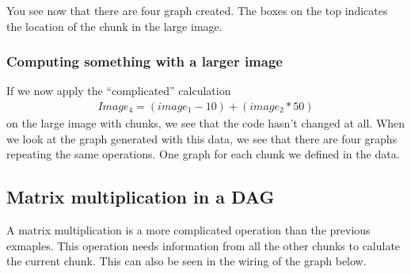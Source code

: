 \documentclass[letterpaper,10pt,english]{sphinxmanual}
\begin{document}
\noindent{}

\sphinxAtStartPar
You see now that there are four graph created. The boxes on the top indicates the location of the chunk in the large image.


\subsubsection{Computing something with a larger image}
\label{\detokenize{01-Introduction:computing-something-with-a-larger-image}}
\sphinxAtStartPar
If we now apply the “complicated” calculation
\begin{equation*}
\begin{split}Image_4=(image_1-10)+(image_2*50)\end{split}
\end{equation*}
\sphinxAtStartPar
on the large image with chunks, we see that the code hasn’t changed at all. When we look at the graph generated with this data, we see that there are four graphs repeating the same operations. One graph for each chunk we defined in the data.

\begin{sphinxVerbatim}[commandchars=\\\{\}]
    
\end{sphinxVerbatim}

\noindent{}


\subsection{Matrix multiplication in a DAG}
\label{\detokenize{01-Introduction:matrix-multiplication-in-a-dag}}
\sphinxAtStartPar
A matrix multiplication is a more complicated operation than the previous exmaples. This operation needs information from all the other chunks to calulate the current chunk. This can also be seen in the wiring of the graph below.

\begin{sphinxVerbatim}[commandchars=\\\{\}]
   
\end{sphinxVerbatim}
\end{document}
